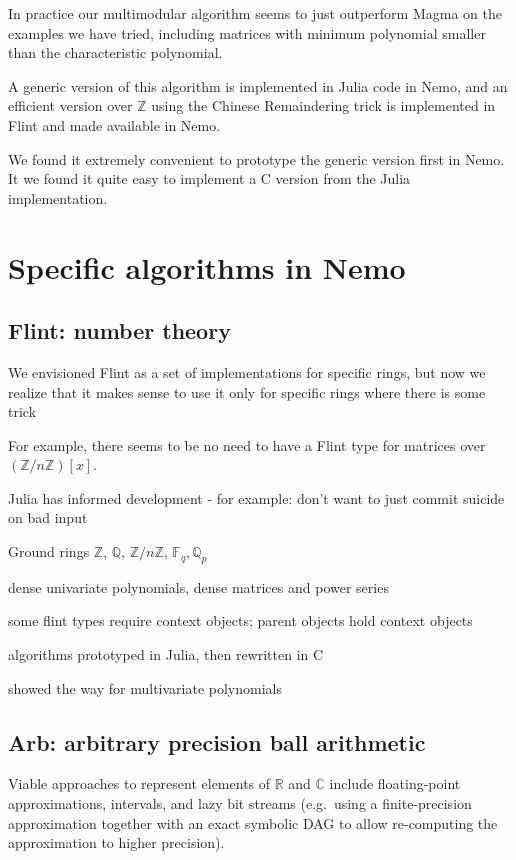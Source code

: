 \documentclass{sig-alternate-05-2015}
\begin{document}
In practice our multimodular algorithm seems to just outperform Magma on the
examples we have tried, including matrices with minimum polynomial smaller 
than the characteristic polynomial.

A generic version of this algorithm is implemented in Julia code in Nemo, and
an efficient version over $\mathbb{Z}$ using the Chinese Remaindering trick
is implemented in Flint and made available in Nemo.

We found it extremely convenient to prototype the generic version first in
Nemo. It we found it quite easy to implement a C version from the Julia
implementation.

\section{Specific algorithms in Nemo}

\subsection{Flint: number theory}

We envisioned Flint as a set of implementations for specific rings,
but now we realize that it makes sense to use it only for specific
rings where there is some trick

For example, there seems to be no need to have a Flint type for
matrices over $\left(\mathbb{Z}/n\mathbb{Z}\right)[x]$.

Julia has informed development - for example: don't want to just commit suicide
on bad input

Ground rings $\mathbb{Z}$, $\mathbb{Q}$, $\mathbb{Z}/n\mathbb{Z}$,
$\mathbb{F}_q, \mathbb{Q}_p$

dense univariate polynomials, dense matrices
and power series

some flint types require context objects; parent objects hold context objects

algorithms prototyped in Julia, then rewritten in C

showed the way for multivariate polynomials 

\subsection{Arb: arbitrary precision ball arithmetic}

Viable approaches to represent elements of $\mathbb{R}$ and $\mathbb{C}$
include floating-point approximations,
intervals, and lazy bit streams (e.g.\ using a finite-precision
approximation together with an exact symbolic DAG
to allow re-computing the approximation to higher precision).
\end{document}
